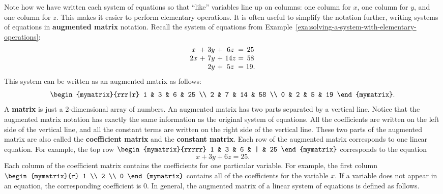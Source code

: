 Note how we have written each system of equations so that ``like''
variables line up on columns: one column for $x$, one column for $y$,
and one column for $z$. This makes it easier to perform elementary
operations. It is often useful to simplify the notation further,
writing systems of equations in \textbf{augmented matrix}%
%
 notation. Recall the
system of equations from Example~\ref{exa:solving-a-system-with-elementary-operations}:
\begin{equation*}
  \begin{array}{c@{~}c@{~}c@{~}c@{~}c@{~}c@{~}c}
    x&+&3y&+&6z&=&25 \\
    2x&+&7y&+&14z&=&58 \\
     &&2y&+&5z&=&19.
  \end{array}
\end{equation*}
This system can be written as an augmented matrix as follows:
\begin{equation*}
  \begin{mymatrix}{rrr|r}
    1 & 3 & 6 & 25 \\
    2 & 7 & 14 & 58 \\
    0 & 2 & 5 & 19
  \end{mymatrix}.
\end{equation*}
A \textbf{matrix} is just a $2$-dimensional array of
numbers. An augmented matrix has two parts separated by a vertical
line. Notice that the augmented matrix notation has exactly the same
information as the original system of equations. All the coefficients
are written on the left side of the vertical line, and all the
constant terms are written on the right side of the vertical
line. These two parts of the augmented matrix are also called the
\textbf{coefficient matrix}%
 and the \textbf{constant
  matrix}.  Each
row of the augmented matrix corresponds to one linear equation. For
example, the top row $\begin{mymatrix}{rrrrr} 1 & 3 & 6 & | & 25
\end{mymatrix}$
corresponds to the equation
\begin{equation*}
  x+3y+6z=25.
\end{equation*}
Each column of the coefficient matrix contains the coefficients
for one particular variable. For example, the first column $\begin{mymatrix}{r}
  1 \\
  2 \\
  0
\end{mymatrix}$ contains all of the coefficients for the variable $x$. If a
variable does not appear in an equation, the corresponding coefficient
is $0$. In general, the augmented matrix of a linear system of
equations is defined as follows.


